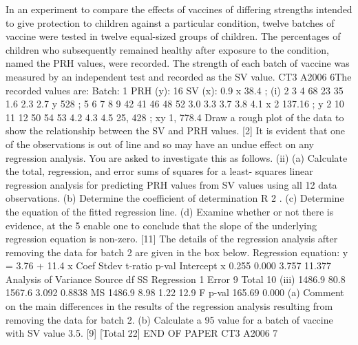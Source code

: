 \documentclass[a4paper,12pt]{article}
\begin{document}
\begin{enumerate}
In an experiment to compare the effects of vaccines of differing strengths intended to
give protection to children against a particular condition, twelve batches of vaccine
were tested in twelve equal-sized groups of children. The percentages of children
who subsequently remained healthy after exposure to the condition, named the PRH
values, were recorded. The strength of each batch of vaccine was measured by an
independent test and recorded as the SV value.
CT3 A2006 6The recorded values are:
Batch:
1
PRH (y): 16
SV (x):
0.9
x 38.4 ;
(i)
2
3
4
68 23 35
1.6 2.3 2.7
y
528 ;
5
6
7
8
9
42 41 46 48 52
3.0 3.3 3.7 3.8 4.1
x 2 137.16 ;
y 2
10 11 12
50 54 53
4.2 4.3 4.5
25, 428 ;
xy 1, 778.4
Draw a rough plot of the data to show the relationship between the SV and
PRH values.
[2]
It is evident that one of the observations is out of line and so may have an undue
effect on any regression analysis. You are asked to investigate this as follows.
(ii)
(a) Calculate the total, regression, and error sums of squares for a least-
squares linear regression analysis for predicting PRH values from SV
values using all 12 data observations.
(b) Determine the coefficient of determination R 2 .
(c) Determine the equation of the fitted regression line.
(d) Examine whether or not there is evidence, at the 5%
enable one to conclude that the slope of the underlying regression
equation is non-zero.
[11]
The details of the regression analysis after removing the data for batch 2 are given in
the box below.
Regression equation: y = 3.76 + 11.4 x
Coef
Stdev
t-ratio p-val
Intercept
x 0.255
0.000
3.757
11.377
Analysis of Variance
Source
df
SS
Regression 1
Error
9
Total
10
(iii)
1486.9
80.8
1567.6
3.092
0.8838
MS
1486.9
8.98
1.22
12.9
F p-val
165.69 0.000
(a) Comment on the main differences in the results of the regression
analysis resulting from removing the data for batch 2.
(b) Calculate a 95%
value for a batch of vaccine with SV value 3.5.
[9]
[Total 22]
END OF PAPER
CT3 A2006 7


\end{enumerate}
\end{document}
